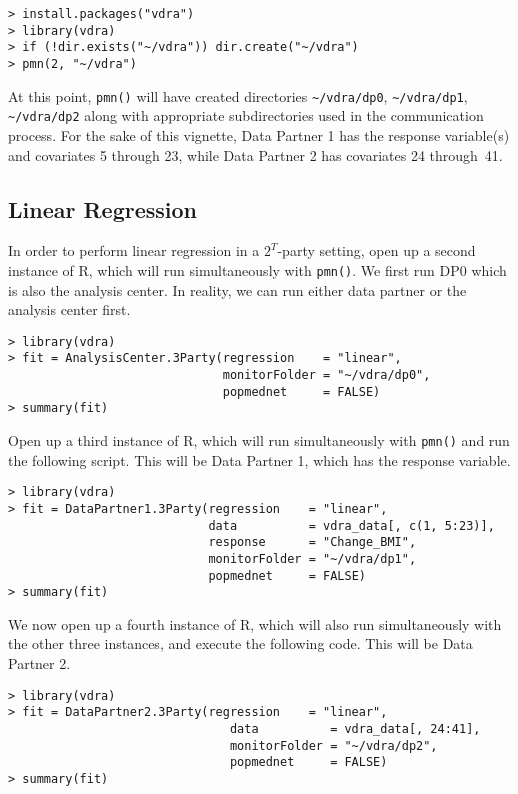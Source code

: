 \documentclass[12]{article}
\begin{document}
\begin{verbatim}
> install.packages("vdra")
> library(vdra)
> if (!dir.exists("~/vdra")) dir.create("~/vdra")
> pmn(2, "~/vdra")
\end{verbatim}

At this point, \verb"pmn()" will have created directories \verb"~/vdra/dp0", \verb"~/vdra/dp1", \verb"~/vdra/dp2" along with appropriate subdirectories used in the communication process.  For the sake of this vignette, Data Partner 1 has the response variable(s) and covariates 5 through 23, while Data Partner 2 has covariates 24 through~41.

\subsection{Linear Regression}

In order to perform linear regression in a $2^T$-party setting, open up a second instance of R, which will run simultaneously with \verb"pmn()".  We first run DP0 which is also the analysis center.  In reality, we can run either data partner or the analysis center first.

\begin{verbatim}
> library(vdra)
> fit = AnalysisCenter.3Party(regression    = "linear",
                              monitorFolder = "~/vdra/dp0",
                              popmednet     = FALSE)
> summary(fit)
\end{verbatim}

Open up a third instance of R, which will run simultaneously with \verb"pmn()" and run the following script.  This will be Data Partner 1, which has the response variable.

\begin{verbatim}
> library(vdra)
> fit = DataPartner1.3Party(regression    = "linear",
                            data          = vdra_data[, c(1, 5:23)],
                            response      = "Change_BMI",
                            monitorFolder = "~/vdra/dp1",
                            popmednet     = FALSE)
> summary(fit)
\end{verbatim}

We now open up a fourth instance of R, which will also run simultaneously with the other three instances, and execute the following code.  This will be Data Partner 2.

\begin{verbatim}
> library(vdra)
> fit = DataPartner2.3Party(regression    = "linear",
                               data          = vdra_data[, 24:41],
                               monitorFolder = "~/vdra/dp2",
                               popmednet     = FALSE)
> summary(fit)
\end{verbatim}
\end{document}
